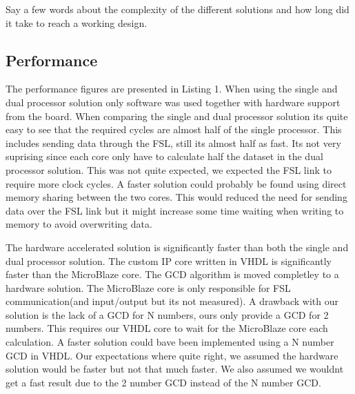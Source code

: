 \documentclass[11pt]{article}
\begin{document}
Say a few words about the complexity of the different solutions and how long did it take to reach a working design.
 
\subsection{Performance}
The performance figures are presented in Listing 1. When using the single and dual processor solution only software was used together with hardware support from the board. When comparing the single and dual processor solution its quite easy to see that the required cycles are almost half of the single processor. This includes sending data through the FSL, still its almost half as fast. Its not very suprising since each core only have to calculate half the dataset in the dual processor solution. This was not quite expected, we expected the FSL link to require more clock cycles. A faster solution could probably be found using direct memory sharing between the two cores. This would reduced the need for sending data over the FSL link but it might increase some time waiting when writing to memory to avoid overwriting data.

The hardware accelerated solution is significantly faster than both the single and dual processor solution. The custom IP core written in VHDL is significantly faster than the MicroBlaze core. The GCD algorithm is moved completley to a hardware solution. The MicroBlaze core is only responsible for FSL communication(and input/output but its not measured). A drawback with our solution is the lack of a GCD for N numbers, ours only provide a GCD for 2 numbers. This requires our VHDL core to wait for the MicroBlaze core each calculation. A faster solution could bave been implemented using a N number GCD in VHDL. Our expectations where quite right, we assumed the hardware solution would be faster but not that much faster. We also assumed we wouldnt get a fast result due to the 2 number GCD instead of the N number GCD.
\end{document}
